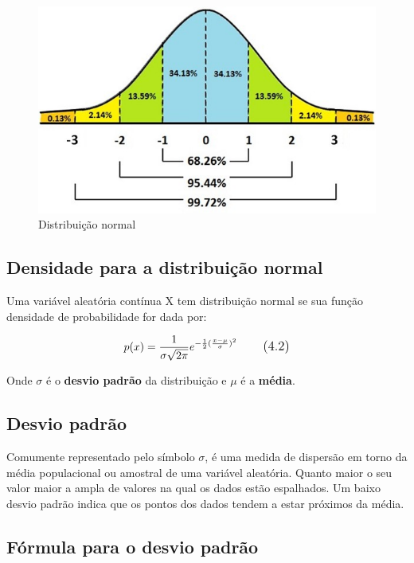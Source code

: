 \begin{figure}[H]
	\centering
	\includegraphics[width=1\textwidth]{./Imagens/Distribuição Normal/GA1.png} 
	\caption{Distribuição normal}
	\label{fig:GA1}
\end{figure}

\subsection{Densidade para a distribuição normal}
Uma variável aleatória contínua X tem distribuição normal se sua função densidade de probabilidade for dada por:

\begin{equation}
\large p(x) = \frac{1}{\sigma \sqrt{2 \pi  }}e^{-\frac{1}{2} (\frac{x-\mu}{\sigma})^2}
\tag{4.2}
\end{equation}

Onde $\sigma$ é o \textbf{desvio padrão} da distribuição e $\mu$ é a \textbf{média}.

\subsection{Desvio padrão}

Comumente representado pelo símbolo $\sigma$, é uma medida de dispersão em torno da média populacional ou amostral de uma variável aleatória. Quanto maior o seu valor maior a ampla de valores na qual os dados estão espalhados. Um baixo desvio padrão indica que os pontos dos dados tendem a estar próximos da média.

\subsection{Fórmula para o desvio padrão}

